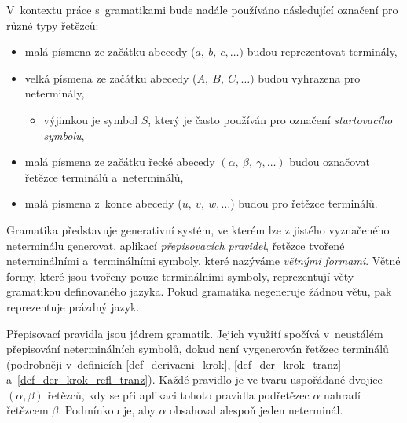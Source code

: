 \begin{convention}\label{conv_oznaceni_symbolu}
    V~kontextu práce s~gramatikami bude nadále používáno následující označení pro různé typy řetězců:
    \begin{itemize}
        \item malá písmena ze začátku abecedy ($a,\: b,\: c,\ldots)$ budou reprezentovat terminály,
        \item velká písmena ze začátku abecedy ($A,\: B,\: C,\ldots)$ budou vyhrazena pro neterminály,
        \begin{itemize}[label=$\circ$]
            \item výjimkou je symbol $S$, který je často používán pro označení \emph{startovacího symbolu},
        \end{itemize}
        \item malá písmena ze začátku řecké abecedy $(\alpha,\: \beta,\: \gamma,\ldots)$ budou označovat řetězce terminálů a~neterminálů,
        \item malá písmena z~konce abecedy ($u,\: v,\: w,\ldots$) budou pro řetězce terminálů.
    \end{itemize}
\end{convention}

Gramatika představuje generativní systém, ve kterém lze z jistého vyznačeného neterminálu generovat, aplikací \emph{přepisovacích pravidel}, řetězce tvořené neterminálními a~terminálními symboly, které nazýváme \emph{větnými formami}. 
Větné formy, které jsou tvořeny pouze terminálními symboly, reprezentují věty gramatikou definovaného jazyka.
Pokud gramatika negeneruje žádnou větu, pak reprezentuje prázdný jazyk.

Přepisovací pravidla jsou jádrem gramatik.
Jejich využití spočívá v~neustálém přepisování neterminálních symbolů, dokud není vygenerován řetězec terminálů (podrobněji v~definicích \ref{def_derivacni_krok}, \ref{def_der_krok_tranz} a~\ref{def_der_krok_refl_tranz}).
Každé pravidlo je ve tvaru uspořádané dvojice $(\alpha, \beta)$ řetězců, kdy se při aplikaci tohoto pravidla podřetězec $\alpha$ nahradí řetězcem $\beta$.
Podmínkou je, aby $\alpha$ obsahoval alespoň jeden neterminál.


